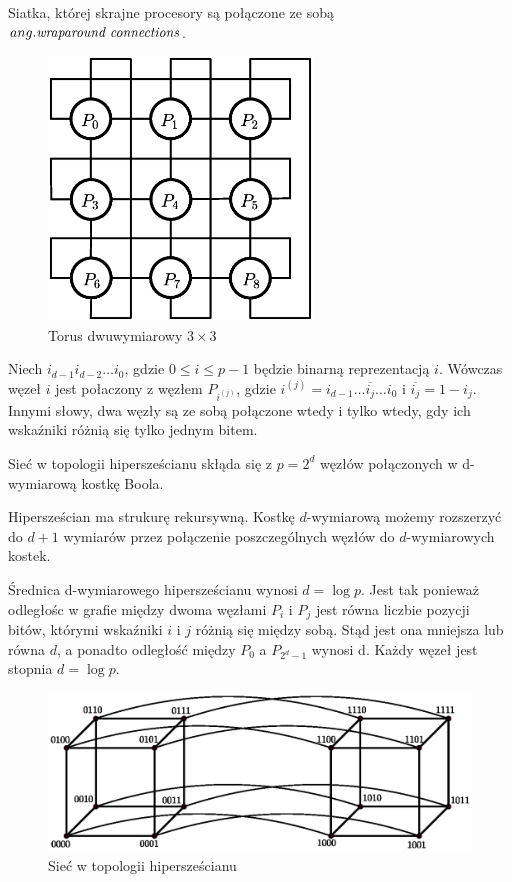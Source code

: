 \begin{przyklad}
Siatka, której skrajne procesory są połączone ze sobą \(ang. \emph{wraparound connections}\).
\begin{figure}[h]
\centering
\includegraphics[width=7cm]{images/torus2d}
\caption{Torus dwuwymiarowy \(3\times3\)}
\label{fig:model_torus2d}
\end{figure}
\end{przyklad}


\begin{definicja}
Niech \(i_{d-1}i_{d-2}\dots i_{0}\), gdzie \(0\leq i \leq p-1\) będzie binarną reprezentacją \(i\). Wówczas węzeł \({i}\) jest połaczony z węzłem \(P_{i^(j)}\), gdzie \(i^{(j)}=i_{d-1}\dots \overline{i_j} \dots i_0\) i \(\overline{i_j} = 1 - i_j\). Innymi słowy, dwa węzły są ze sobą połączone wtedy i tylko wtedy, gdy ich wskaźniki różnią się tylko jednym bitem.\\
\end{definicja}
\begin{przyklad}
Sieć w topologii hipersześcianu skłąda się z \(p=2^d\) węzłów połączonych w d-wymiarową kostkę Boola.

Hipersześcian ma strukurę rekursywną. Kostkę \(d\)-wymiarową możemy rozszerzyć do \(d+1\) wymiarów przez połączenie poszczególnych węzłów do \(d\)-wymiarowych kostek.

Średnica d-wymiarowego hipersześcianu wynosi \(d=\log{p}\). Jest tak ponieważ odległośc w grafie między dwoma węzłami \(P_i\) i \(P_j\) jest równa liczbie pozycji bitów, którymi wskaźniki \(i\) i \(j\) różnią się między sobą. Stąd jest ona mniejsza lub równa \(d\), a ponadto odległość między \(P_0\) a \(P_{2^d-1}\) wynosi d. Każdy węzeł jest stopnia \(d=\log{p}\).


\begin{figure}[h]
\centering
\includegraphics[width=32em]{images/systolic.eps}
\caption{Sieć w topologii hipersześcianu}
\label{fig:systolic}
\end{figure}
\end{przyklad}	